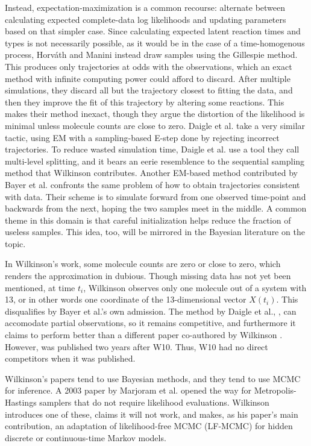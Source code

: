 \documentclass{article}
\begin{document}
 Instead, expectation-maximization is a common recourse: alternate between calculating expected complete-data log likelihoods and updating parameters based on that simpler case. Since calculating expected latent reaction times and types is not necessarily possible, as it would be in the case of a time-homogenous process, Horv\'ath and Manini \cite{horvath2008parameter} instead draw samples using the Gillespie method. This produces only trajectories at odds with the observations, which an exact method with infinite computing power could afford to discard. After multiple simulations, they discard all but the trajectory closest to fitting the data, and then they improve the fit of this trajectory by altering some reactions. This makes their method inexact, though they argue the distortion of the likelihood is minimal unless molecule counts are close to zero. Daigle et al. \cite{daigle2012accelerated} take a very similar tactic, using EM with a sampling-based E-step done by rejecting incorrect trajectories. To reduce wasted simulation time, Daigle et al. use a tool they call multi-level splitting, and it bears an eerie resemblence to the sequential sampling method that Wilkinson contributes. Another EM-based method contributed by Bayer et al. \cite{bayer2015stoch_em} confronts the same problem of how to obtain trajectories consistent with data. Their scheme is to simulate forward from one observed time-point and backwards from the next, hoping the two samples meet in the middle. A common theme in this domain is that careful initialization helps reduce the fraction of useless samples. This idea, too, will be mirrored in the Bayesian literature on the topic.

In Wilkinson's work, some molecule counts are zero or close to zero, which renders the approximation in \cite{horvath2008parameter} dubious. Though missing data has not yet been mentioned, at time $t_i$, Wilkinson observes only one molecule out of a system with 13, or in other words one coordinate of the 13-dimensional vector $X(t_i)$. This disqualifies \cite{bayer2015stoch_em} by Bayer et al.'s own admission. The method by Daigle et al., \cite{daigle2012accelerated}, can accomodate partial observations, so it remains competitive, and furthermore it claims to perform better than a different paper co-authored by Wilkinson \cite{Boys2008}. However, \cite{daigle2012accelerated} was published two years after W10. Thus, W10 had no direct competitors when it was published.

Wilkinson's papers tend to use Bayesian methods, and they tend to use MCMC for inference. A 2003 paper by Marjoram et al. \cite{Marjoram23122003} opened the way for Metropolis-Hastings samplers that do not require likelihood evaluations. Wilkinson introduces one of these, claims it will not work, and makes, as his paper's main contribution, an adaptation of likelihood-free MCMC (LF-MCMC) for hidden discrete or continuous-time Markov models.
\end{document}
